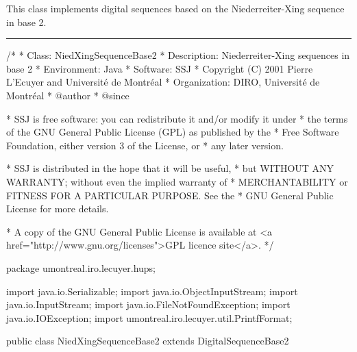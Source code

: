 
This class implements digital sequences based on the
 Niederreiter-Xing sequence in base 2.


\bigskip\hrule
\begin{code}
\begin{hide}
/*
 * Class:        NiedXingSequenceBase2
 * Description:  Niederreiter-Xing sequences in base 2
 * Environment:  Java
 * Software:     SSJ 
 * Copyright (C) 2001  Pierre L'Ecuyer and Université de Montréal
 * Organization: DIRO, Université de Montréal
 * @author       
 * @since

 * SSJ is free software: you can redistribute it and/or modify it under
 * the terms of the GNU General Public License (GPL) as published by the
 * Free Software Foundation, either version 3 of the License, or
 * any later version.

 * SSJ is distributed in the hope that it will be useful,
 * but WITHOUT ANY WARRANTY; without even the implied warranty of
 * MERCHANTABILITY or FITNESS FOR A PARTICULAR PURPOSE.  See the
 * GNU General Public License for more details.

 * A copy of the GNU General Public License is available at
   <a href="http://www.gnu.org/licenses">GPL licence site</a>.
 */
\end{hide}
package umontreal.iro.lecuyer.hups; \begin{hide} 

import java.io.Serializable;
import java.io.ObjectInputStream;
import java.io.InputStream;
import java.io.FileNotFoundException;
import java.io.IOException;
import umontreal.iro.lecuyer.util.PrintfFormat;
\end{hide}

public class NiedXingSequenceBase2 extends DigitalSequenceBase2 \begin{hide} { 

   private static final int MAXDIM  = 32;  // Maximum dimension.
   private static final int NUMCOLS = 30;  // Maximum number of columns.
   private static final boolean isTrans = true;
\end{hide} 
\end{code}
